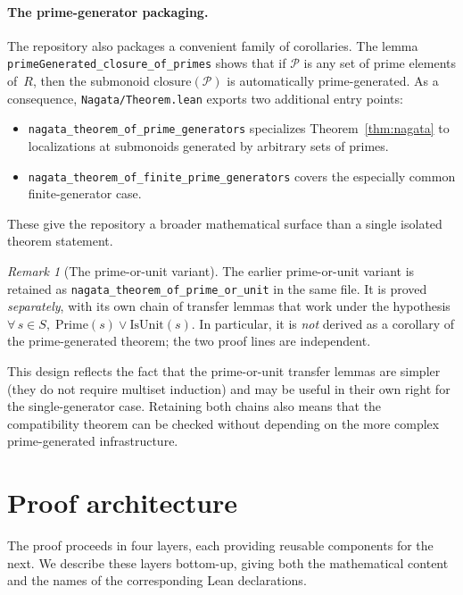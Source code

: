 \documentclass[11pt]{article}
\theoremstyle{plain}
\theoremstyle{definition}
\theoremstyle{remark}
\newtheorem{remark}[theorem]{Remark}
\newcommand{\li}[1]{\texorpdfstring{\texttt{#1}}{#1}}
\newcommand{\lf}[1]{\texorpdfstring{\nolinkurl{#1}}{#1}}
\begin{document}
\paragraph{The prime-generator packaging.}
The repository also packages a convenient family of corollaries.  The lemma
\li{primeGenerated\_closure\_of\_primes} shows that if $\mathcal{P}$ is any
set of prime elements of~$R$, then the submonoid
$\mathrm{closure}(\mathcal{P})$ is automatically prime-generated.
As a consequence, \lf{Nagata/Theorem.lean} exports two additional entry points:
\begin{itemize}[nosep]
\item \li{nagata\_theorem\_of\_prime\_generators} specializes
  Theorem~\ref{thm:nagata} to localizations at submonoids generated by
  arbitrary sets of primes.
\item \li{nagata\_theorem\_of\_finite\_prime\_generators} covers the especially
  common finite-generator case.
\end{itemize}
These give the repository a broader mathematical surface than a single
isolated theorem statement.

\begin{remark}[The prime-or-unit variant]\label{rem:prime-or-unit}
The earlier prime-or-unit variant is retained as
\li{nagata\_theorem\_of\_prime\_or\_unit} in the same file.  It is proved
\emph{separately}, with its own chain of transfer lemmas that work under the
hypothesis $\forall\,s\in S,\;\mathrm{Prime}(s)\lor\mathrm{IsUnit}(s)$.  In
particular, it is \emph{not} derived as a corollary of the prime-generated
theorem; the two proof lines are independent.

This design reflects the fact that the prime-or-unit transfer lemmas are
simpler (they do not require multiset induction) and may be useful in their own
right for the single-generator case.  Retaining both chains also means that the
compatibility theorem can be checked without depending on the more complex
prime-generated infrastructure.
\end{remark}


\section{Proof architecture}\label{sec:architecture}

The proof proceeds in four layers, each providing reusable components for the
next.  We describe these layers bottom-up, giving both the mathematical content
and the names of the corresponding Lean declarations.
\end{document}
